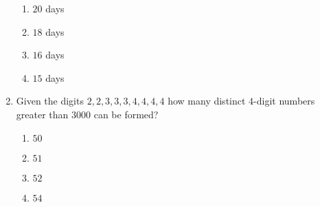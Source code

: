\documentclass[journal,12pt,twocolumn]{IEEEtran}
\theoremstyle{remark}
\begin{document}
\begin{enumerate}[start=53]
    \begin{enumerate}
        \item $20$ days
        \item $18$ days
        \item $16$ days
        \item $15$ days
    \end{enumerate}

    \item Given the digits $2, 2, 3, 3, 3, 4, 4, 4, 4$ how many distinct $4$-digit numbers greater than $3000$ can be formed?

    \begin{enumerate}
        \item $50$
        \item $51$
        \item $52$
        \item $54$
    \end{enumerate}




    


\end{enumerate}
\end{document}
